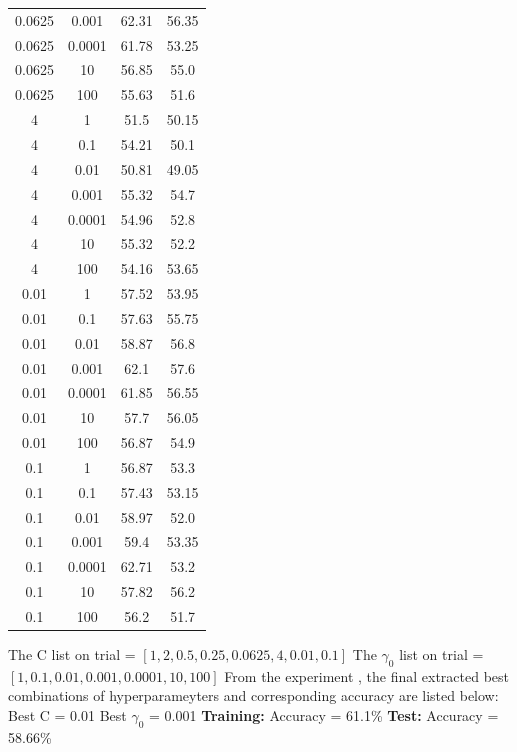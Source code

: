 \documentclass{article}
\begin{document}
\begin{longtable}{c|c|c|c}
	  0.0625 & 0.001 & 62.31 & 56.35 \\
	  0.0625 & 0.0001 & 61.78 & 53.25 \\
	  0.0625 & 10 & 56.85 & 55.0 \\
	  0.0625 & 100 & 55.63 & 51.6 \\
	  4 & 1 & 51.5 & 50.15 \\
	  4 & 0.1 & 54.21 & 50.1 \\
	  4 & 0.01 & 50.81 & 49.05 \\
	  4 & 0.001 & 55.32 & 54.7 \\
	  4 & 0.0001 & 54.96 & 52.8 \\
	  4 & 10 & 55.32 & 52.2 \\
	  4 & 100 & 54.16 & 53.65 \\
	  0.01 & 1 & 57.52 & 53.95 \\
	  0.01 & 0.1 & 57.63 & 55.75 \\
	  0.01 & 0.01 & 58.87 & 56.8 \\
	  0.01 & 0.001 & 62.1 & 57.6 \\
	  0.01 & 0.0001 & 61.85 & 56.55 \\
	  0.01 & 10 & 57.7 & 56.05 \\
	  0.01 & 100 & 56.87 & 54.9 \\
	  0.1 & 1 & 56.87 & 53.3 \\
	  0.1 & 0.1 & 57.43 & 53.15 \\
	  0.1 & 0.01 & 58.97 & 52.0 \\
	  0.1 & 0.001 & 59.4 & 53.35 \\
	  0.1 & 0.0001 & 62.71 & 53.2 \\
	  0.1 & 10 & 57.82 & 56.2 \\
	  0.1 & 100 & 56.2 & 51.7 \\ [1ex]
  \end{longtable}

  The C list on trial = $[1, 2, 0.5, 0.25, 0.0625, 4, 0.01, 0.1]$ \newline
  The $\gamma_0$ list on trial = $[1, 0.1, 0.01, 0.001, 0.0001, 10, 100]$ \newline
  From the experiment , the final extracted best combinations of hyperparameyters and corresponding accuracy are listed below: \newline
  Best C = 0.01 \newline
  Best $\gamma_0$ = 0.001 \newline
  \textbf {Training:} Accuracy = 61.1\% \newline
  \textbf {Test:} Accuracy = 58.66\% \newline
\end{document}
